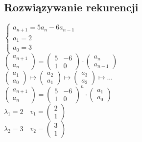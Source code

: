 \documentclass[10pt]{article}
\theoremstyle{definition}
\theoremstyle{definition}
\theoremstyle{definition}
\theoremstyle{definition}
\theoremstyle{remark}
\theoremstyle{definition}
\theoremstyle{definition}
\theoremstyle{definition}
\theoremstyle{definition}
\theoremstyle{definition}
\begin{document}
\subsection{Rozwiązywanie rekurencji} 
$\begin{cases} 
    a_{n+1} = 5a_n - 6a_{n-1} \\ 
    a_1 = 2 \\ 
    a_0 = 3
\end{cases}$ \\ 
$\begin{pmatrix} 
    a_{n+1} \\ a_n
    \end{pmatrix} = \begin{pmatrix} 5 & -6 \\ 1 & 0 \end{pmatrix} \cdot \begin{pmatrix} a_n \\ a_{n-1}
    \end{pmatrix}$ \\ 
$\begin{pmatrix} a_1 \\ a_0 \end{pmatrix} \mapsto \begin{pmatrix} a_2 \\ a_1 \end{pmatrix} 
\mapsto \begin{pmatrix} a_3 \\ a_2 \end{pmatrix} \mapsto \ldots$  \\ 
$\begin{pmatrix} 
    a_{n+1} \\ a_n
    \end{pmatrix} = \begin{pmatrix} 5 & -6 \\ 1 & 0 \end{pmatrix}^n \cdot \begin{pmatrix} a_1 \\ a_0
    \end{pmatrix}$ \\
$\lambda_1 = 2 \quad v_1 = \begin{pmatrix} 2 \\ 1 \end{pmatrix}$ \\ 
$\lambda_2 = 3 \quad v_2 = \begin{pmatrix} 3 \\ 1 \end{pmatrix}$ \\ 
\end{document}
